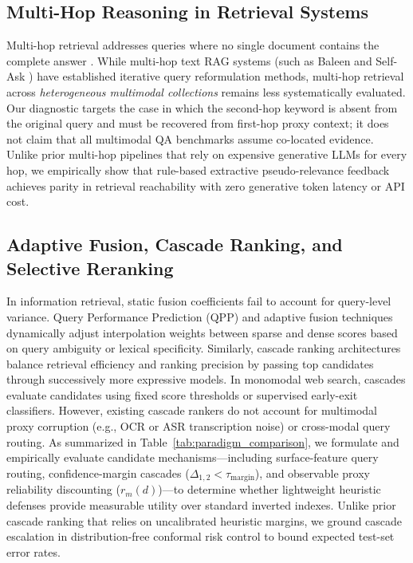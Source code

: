 \documentclass[conference]{IEEEtran}
\begin{document}
\subsection{Multi-Hop Reasoning in Retrieval Systems}
Multi-hop retrieval addresses queries where no single document contains the complete answer \cite{xiong2021multihop, khattab2021baleen}. While multi-hop text RAG systems (such as Baleen \cite{khattab2021baleen} and Self-Ask \cite{press2023selfask}) have established iterative query reformulation methods, multi-hop retrieval across \textit{heterogeneous multimodal collections} remains less systematically evaluated. Our diagnostic targets the case in which the second-hop keyword is absent from the original query and must be recovered from first-hop proxy context; it does not claim that all multimodal QA benchmarks assume co-located evidence. Unlike prior multi-hop pipelines that rely on expensive generative LLMs for every hop, we empirically show that rule-based extractive pseudo-relevance feedback achieves parity in retrieval reachability with zero generative token latency or API cost.

\subsection{Adaptive Fusion, Cascade Ranking, and Selective Reranking}
In information retrieval, static fusion coefficients fail to account for query-level variance. Query Performance Prediction (QPP) \cite{carmel2010qpp} and adaptive fusion techniques dynamically adjust interpolation weights between sparse and dense scores based on query ambiguity or lexical specificity. Similarly, cascade ranking architectures \cite{wang2011cascade, gallagher2019cascade} balance retrieval efficiency and ranking precision by passing top candidates through successively more expressive models. In monomodal web search, cascades evaluate candidates using fixed score thresholds or supervised early-exit classifiers. However, existing cascade rankers do not account for multimodal proxy corruption (e.g., OCR or ASR transcription noise) or cross-modal query routing. As summarized in Table~\ref{tab:paradigm_comparison}, we formulate and empirically evaluate candidate mechanisms---including surface-feature query routing, confidence-margin cascades ($\Delta_{1,2} < \tau_{\text{margin}}$), and observable proxy reliability discounting ($r_m(d)$)---to determine whether lightweight heuristic defenses provide measurable utility over standard inverted indexes. Unlike prior cascade ranking that relies on uncalibrated heuristic margins, we ground cascade escalation in distribution-free conformal risk control to bound expected test-set error rates.
\end{document}
